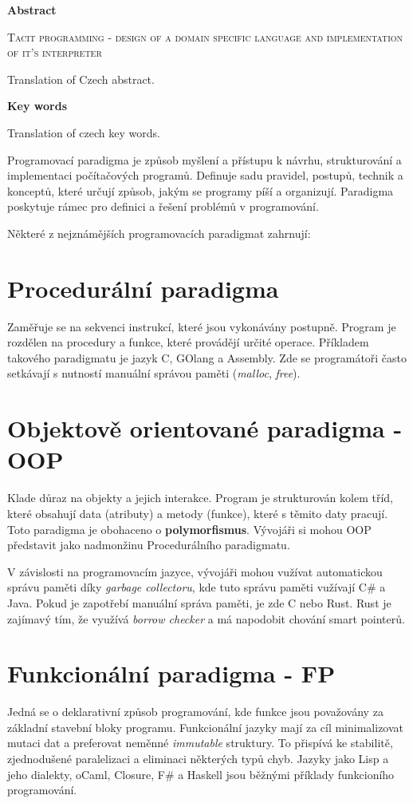 \documentclass[male,czech]{kithesis}
\newcommand{\TITULen}{Tacit programming - design of a domain specific language and implementation of it's interpreter} %
\begin{document}
\vspace{1em}
\hrulefill
\vspace{1em}

\textbf{\textsf{Abstract}}

\textsc{\TITULen}

Translation of Czech abstract.

\textbf{\textsf{Key words}}

Translation of czech key words.

{
  \hypersetup{linkcolor=black}
  \tableofcontents
}


Programovací paradigma je způsob myšlení a přístupu k návrhu, 
strukturování a implementaci počítačových programů. 
Definuje sadu pravidel, postupů, technik a konceptů, které určují způsob,
jakým se programy píší a organizují. Paradigma poskytuje rámec pro definici a 
řešení problémů v programování.

Některé z nejznámějších programovacích paradigmat zahrnují:

\section{Procedurální paradigma}
Zaměřuje se na sekvenci instrukcí, 
které jsou vykonávány postupně. 
Program je rozdělen na procedury a funkce, které provádějí určité operace. Příkladem takového 
paradigmatu je jazyk C, GOlang a Assembly. Zde se programátoři často setkávají s nutností
manuální správou paměti (\textit{malloc}, \textit{free}).

\section{Objektově orientované paradigma - OOP}
Klade důraz na objekty a jejich interakce. 
Program je strukturován kolem tříd, které obsahují data (atributy) a metody (funkce), 
které s těmito daty pracují. Toto paradigma je obohaceno o \textbf{polymorfismus}.
Vývojáři si mohou OOP představit jako nadmonžinu Procedurálního paradigmatu.

V závislosti na programovacím jazyce, 
vývojáři mohou vužívat automatickou správu paměti díky \textit{garbage collectoru}, kde 
tuto správu paměti vužívají C\# a Java. Pokud je zapotřebí manuální správa paměti, je zde
C\+\+ nebo Rust. Rust je zajímavý tím, že využívá \textit{borrow checker} a má napodobit
chování smart pointerů.


\section{Funkcionální paradigma - FP}
Jedná se o deklarativní způsob programování, kde funkce jsou 
považovány za základní stavební bloky programu. 
Funkcionální jazyky mají za cíl minimalizovat mutaci dat a preferovat neměnné \textit{immutable}
struktury. 
To přispívá ke stabilitě, zjednodušené paralelizaci a eliminaci některých typů chyb. 
Jazyky jako Lisp a jeho dialekty, oCaml, Closure, F\# a Haskell 
jsou běžnými příklady funkcioního programování.
\end{document}
